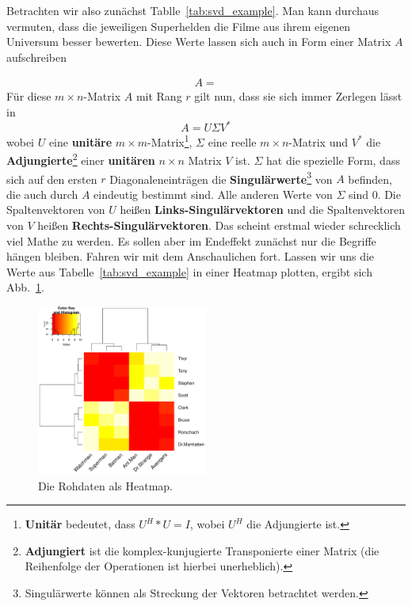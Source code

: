 

Betrachten wir also zunächst Tablle~\ref{tab:svd_example}. Man kann durchaus vermuten,
dass die jeweiligen Superhelden die Filme aus ihrem eigenen Universum besser bewerten.
Diese Werte lassen sich auch in Form einer Matrix \(A\) aufschreiben

\begin{align*}
	A = 
\end{align*}
Für diese \(m\times n\)-Matrix \(A\) mit Rang \(r\) gilt nun, dass sie sich immer 
Zerlegen lässt in
\[
	A = U\Sigma V^*
\]
wobei \(U\) eine \textbf{unitäre} \(m\times m\)-Matrix\footnote{\textbf{Unitär} bedeutet,
dass \(U^{H}*U = I\), wobei \(U^{H}\) die Adjungierte ist.}, \(\Sigma\) eine 
reelle \(m\times n\)-Matrix und \(V^*\) die \textbf{Adjungierte}\footnote{
\textbf{Adjungiert} ist die komplex-kunjugierte Transponierte einer Matrix (die Reihenfolge der
Operationen ist hierbei unerheblich).} einer
\textbf{unitären} \(n\times n\) Matrix \(V\) ist. \(\Sigma\) hat die spezielle Form, dass
sich auf den ersten \(r\) Diagonaleneinträgen die \textbf{Singulärwerte}\footnote{Singulärwerte
können als Streckung der Vektoren betrachtet werden.} von \(A\)
befinden, die auch durch \(A\) eindeutig bestimmt sind. Alle anderen Werte von
\(\Sigma\) sind \(0\). Die Spaltenvektoren von \(U\) heißen \textbf{Links-Singulärvektoren}
und die Spaltenvektoren von \(V\) heißen \textbf{Rechts-Singulärvektoren}.
Das scheint erstmal wieder schrecklich viel Mathe zu werden. Es sollen aber im
Endeffekt zunächst nur die Begriffe hängen bleiben. Fahren wir mit dem Anschaulichen
fort. Lassen wir uns die Werte aus Tabelle~\ref{tab:svd_example} in einer Heatmap
plotten, ergibt sich Abb.~\ref{fig:original_data}.

\begin{figure}[!th]
	\center
	\includegraphics[width=0.5\textwidth]{Figures/original_data}
	\caption{Die Rohdaten als Heatmap.}
	\label{fig:original_data}
\end{figure}

